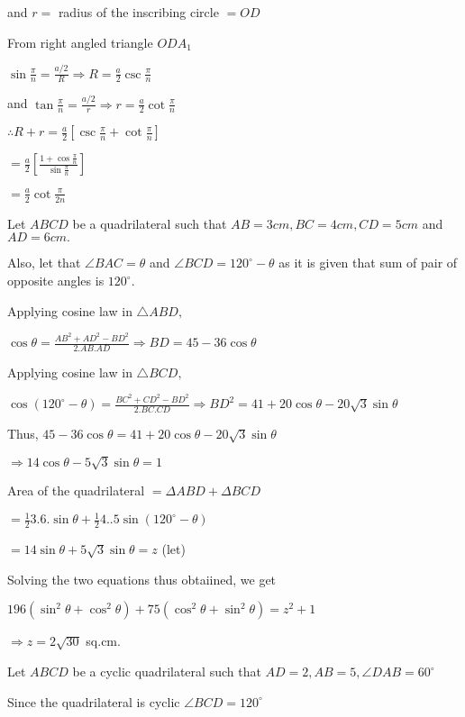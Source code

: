   and $r =$ radius of the inscribing circle $= OD$

  From right angled triangle $ODA_1$

  $\sin\frac{\pi}{n} = \frac{a/2}{R} \Rightarrow R = \frac{a}{2}\csc\frac{\pi}{n}$

  and $\tan\frac{\pi}{n} = \frac{a/2}{r} \Rightarrow r = \frac{a}{2}\cot\frac{\pi}{n}$

  $\therefore R + r = \frac{a}{2}\left[\csc\frac{\pi}{n} + \cot\frac{\pi}{n}\right]$

  $= \frac{a}{2}\left[\frac{1 + \cos\frac{\pi}{n}}{\sin\frac{\pi}{n}}\right]$

  $= \frac{a}{2}\cot\frac{\pi}{2n}$

\item Let $ABCD$ be a quadrilateral such that $AB = 3 cm, BC = 4 cm, CD= 5 cm$ and $AD = 6 cm.$

  Also, let that $\angle BAC = \theta$ and $\angle BCD = 120^\circ - \theta$ as it is given that sum of pair of
  opposite angles is $120^\circ.$

  Applying cosine law in $\triangle ABD,$

  $\cos\theta = \frac{AB^2 + AD^2 - BD^2}{2.AB.AD} \Rightarrow BD = 45 - 36\cos\theta$

  Applying cosine law in $\triangle BCD,$

  $\cos(120^\circ - \theta) = \frac{BC^2 + CD^2 - BD^2}{2.BC.CD} \Rightarrow BD^2 = 41 + 20\cos \theta - 20\sqrt{3}\sin\theta$

  Thus, $45 - 36\cos\theta = 41 + 20\cos\theta - 20\sqrt{3}\sin\theta$

  $\Rightarrow 14\cos\theta - 5\sqrt{3}\sin\theta = 1$

  Area of the quadrilateral $= \Delta ABD + \Delta BCD$

  $= \frac{1}{2}3.6.\sin\theta + \frac{1}{2}4..5\sin(120^\circ - \theta)$

  $= 14\sin\theta + 5\sqrt{3}\sin\theta = z$ (let)

  Solving the two equations thus obtaiined, we get

  $196(\sin^2\theta + \cos^2\theta) + 75(\cos^2\theta + \sin^2\theta) = z^2 + 1$

  $\Rightarrow z = 2\sqrt{30}$ sq.cm.

\item Let $ABCD$ be a cyclic quadrilateral such that $AD = 2, AB = 5, \angle DAB = 60^\circ$

  Since the quadrilateral is cyclic $\angle BCD = 120^\circ$

